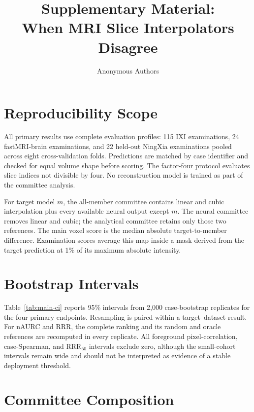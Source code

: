 \documentclass[twocolumn]{article}
\title{Supplementary Material:\\When MRI Slice Interpolators Disagree}
\author{Anonymous Authors}
\date{}
\begin{document}
\maketitle

\section{Reproducibility Scope}

All primary results use complete evaluation profiles: 115 IXI examinations, 24 fastMRI-brain examinations, and 22 held-out NingXia examinations pooled across eight cross-validation folds. Predictions are matched by case identifier and checked for equal volume shape before scoring. The factor-four protocol evaluates slice indices not divisible by four. No reconstruction model is trained as part of the committee analysis.

For target model $m$, the all-member committee contains linear and cubic interpolation plus every available neural output except $m$. The neural committee removes linear and cubic; the analytical committee retains only those two references. The main voxel score is the median absolute target-to-member difference. Examination scores average this map inside a mask derived from the target prediction at 1\% of its maximum absolute intensity.

\section{Bootstrap Intervals}

Table~\ref{tab:main-ci} reports 95\% intervals from 2,000 case-bootstrap replicates for the four primary endpoints. Resampling is paired within a target--dataset result. For nAURC and RRR, the complete ranking and its random and oracle references are recomputed in every replicate. All foreground pixel-correlation, case-Spearman, and RRR$_{50}$ intervals exclude zero, although the small-cohort intervals remain wide and should not be interpreted as evidence of a stable deployment threshold.

\begin{table}[t]
  \centering
  \caption{Primary point estimates with case-bootstrap 95\% intervals. RRR$_{50}$ is expressed as a percentage.}
  \label{tab:main-ci}
  \resizebox{\textwidth}{!}{}
\end{table}

\section{Committee Composition}
\end{document}
